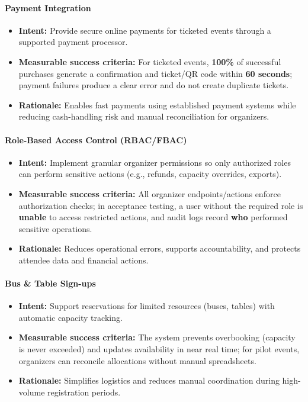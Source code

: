 \documentclass{article}
\begin{document}
\paragraph{Payment Integration}
\begin{itemize}
    \item \textbf{Intent:} Provide secure online payments for ticketed events through a supported payment processor.
    \item \textbf{Measurable success criteria:} For ticketed events, \textbf{100\%} of successful purchases generate a confirmation and ticket/QR code within \textbf{60 seconds}; payment failures produce a clear error and do not create duplicate tickets.
    \item \textbf{Rationale:} Enables fast payments using established payment systems while reducing cash-handling risk and manual reconciliation for organizers.
\end{itemize}

\paragraph{Role-Based Access Control (RBAC/FBAC)}
\begin{itemize}
    \item \textbf{Intent:} Implement granular organizer permissions so only authorized roles can perform sensitive actions (e.g., refunds, capacity overrides, exports).
    \item \textbf{Measurable success criteria:} All organizer endpoints/actions enforce authorization checks; in acceptance testing, a user without the required role is \textbf{unable} to access restricted actions, and audit logs record \textbf{who} performed sensitive operations.
    \item \textbf{Rationale:} Reduces operational errors, supports accountability, and protects attendee data and financial actions.
\end{itemize}

\paragraph{Bus \& Table Sign-ups}
\begin{itemize}
    \item \textbf{Intent:} Support reservations for limited resources (buses, tables) with automatic capacity tracking.
    \item \textbf{Measurable success criteria:} The system prevents overbooking (capacity is never exceeded) and updates availability in near real time; for pilot events, organizers can reconcile allocations without manual spreadsheets.
    \item \textbf{Rationale:} Simplifies logistics and reduces manual coordination during high-volume registration periods.
\end{itemize}
\end{document}
